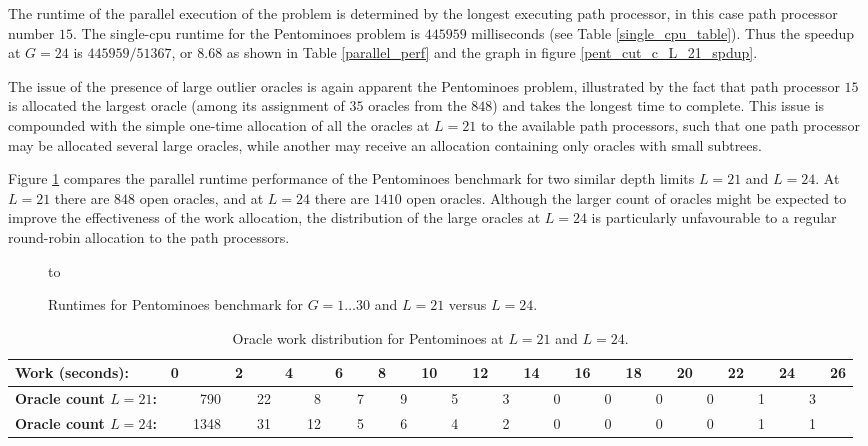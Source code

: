 The runtime of the parallel execution of the problem is determined by the longest
executing path processor, in this case path processor number $15$.  The single-cpu
runtime for the Pentominoes problem is $445959$ milliseconds (see Table
\ref{single_cpu_table}).  Thus the speedup at $G=24$ is $445959/51367$, or $8.68$ as
shown in Table \ref{parallel_perf} and the graph in figure
\ref{pent_cut_c_L_21_spdup}.

The issue of the presence of large outlier oracles is again apparent the
Pentominoes problem, illustrated by the fact that path processor $15$ is allocated the
largest oracle (among its assignment of $35$ oracles from the $848$) and takes the
longest time to complete.  This issue is compounded with the simple one-time allocation of 
all the oracles at $L=21$ to the available path processors, such that one path processor may
be allocated several large oracles, while another may receive an allocation containing only
oracles with small subtrees.

Figure \ref{pentbook_cut_c_L_24} compares the parallel runtime performance of the
Pentominoes benchmark for two similar depth limits $L=21$ and $L=24$.  At $L=21$ there
are $848$ open oracles, and at $L=24$ there are $1410$ open oracles.  Although the
larger count of oracles might be expected to improve the effectiveness of the work
allocation, the distribution of the large oracles at $L=24$ is particularly unfavourable
to a regular round-robin allocation to the path processors.

\begin{figure}[htbp]
\vspace{5mm} \hbox to 
\caption{Runtimes for Pentominoes benchmark for $G=1\ldots 30$ and $L=21$ versus $L=24$.}
\vspace{5mm}
\label{pentbook_cut_c_L_24}
\end{figure}

\begin{table}[htbp]
{\small
\begin{tabular}{| l | r @{} r @{} r @{} r @{} r @{} r @{} r @{} r @{} r @{} r @{} r @{}
   r @{} r @{} r @{} r @{} r @{} r @{} r @{} r @{} r @{} r @{} r @{} r @{} r @{} r @{}
   r @{} r |}
\hline
\textbf{Work (seconds):} & 0 & & 2 & & 4 & & 6 & & 8 &
 & 10 & & 12 & & 14 & & 16 & & 18 &
 & 20 & & 22 & & 24 &
 & 26 \\
\hline
\textbf{Oracle count $L=21$:} & & 790 & & 22 & & 8 & & 7 & & 9 & & 5 & & 3 & & 0 & &
 0 & & 0 & & 0 & & 1 & & 3 & \\
\hline
\textbf{Oracle count $L=24$:} & & 1348 & & 31 & & 12 & & 5 & & 6 & & 4 & & 2 & & 0 & &
 0 & & 0 & & 0 & & 1 & & 1 & \\
\hline
\end{tabular}
}
\caption{Oracle work distribution for Pentominoes at $L=21$ and $L=24$.}
\label{pent24_orc_groups}
\end{table}

